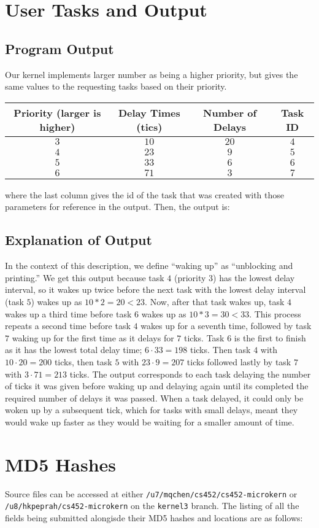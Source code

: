 \documentclass[12pt]{article}
\begin{document}
\section{User Tasks and Output}
\subsection{Program Output}
Our kernel implements larger number as being a higher priority, but gives the same values to the requesting tasks based on their priority.
\begin{center}
  \begin{tabular}{|c|c|c|c|}
    \hline
    {\bf Priority (larger is higher)} & {\bf Delay Times (tics)} & {\bf Number of Delays} & {\bf Task ID} \\\hline
    $3$ & $10$ & $20$ & $4$\\\hline
    $4$ & $23$ & $9$ & $5$\\\hline
    $5$ & $33$ & $6$ & $6$\\\hline
    $6$ & $71$ & $3$ & $7$\\\hline
  \end{tabular}
\end{center}
where the last column gives the id of the task that was created with those parameters for reference in the output.  Then, the output is:

\subsection{Explanation of Output}
In the context of this description, we define ``waking up'' as ``unblocking and printing.''  We get this output because task $4$ (priority $3$) has the lowest delay interval, so it wakes up twice before the next task with the lowest delay interval (task $5$) wakes up as $10 * 2 = 20 < 23$.  Now, after that task wakes up, task $4$ wakes up a third time before task $6$ wakes up as $10 * 3 = 30 < 33$.   This process repeats a second time before task $4$ wakes up for a seventh time, followed by task $7$ waking up for the first time as it delays for $7$ ticks.  Task $6$ is the first to finish as it has the lowest total delay time; $6\cdot 33 = 198$ ticks.  Then task $4$ with $10\cdot 20 = 200$ ticks, then task $5$ with $23\cdot 9 = 207$ ticks followed lastly by task $7$ with $3\cdot 71 = 213$ ticks.  The output corresponds to each task delaying the number of ticks it was given before waking up and delaying again until its completed the required number of delays it was passed.  When a task delayed, it could only be woken up by a subsequent tick, which for tasks with small delays, meant they would wake up faster as they would be waiting for a smaller amount of time.
\\[2\baselineskip]

\section{MD5 Hashes}
Source files can be accessed at either \texttt{/u7/mqchen/cs452/cs452-microkern} or \\ \texttt{/u8/hkpeprah/cs452-microkern} on the \texttt{kernel3} branch. The listing of all the fields being submitted alongisde their MD5 hashes and locations are as follows:

\end{document}
